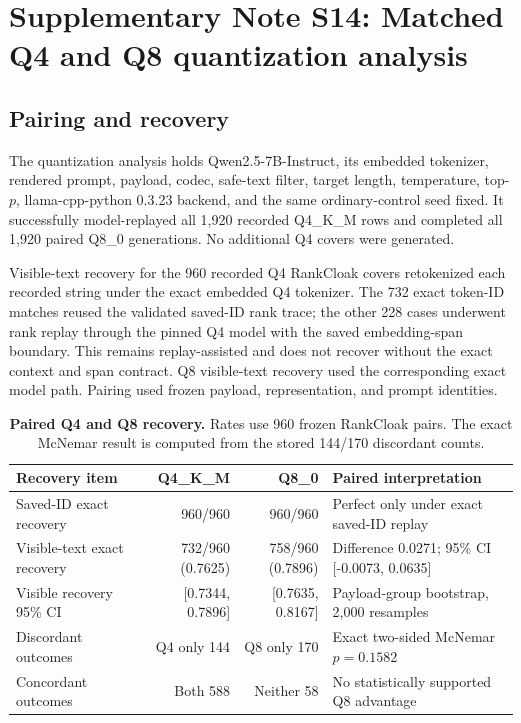 \documentclass[fleqn,10pt]{wlscirep}
\begin{document}
\section*{Supplementary Note S14: Matched Q4 and Q8 quantization analysis}\label{si:s14}

\subsection*{Pairing and recovery}

The quantization analysis holds Qwen2.5-7B-Instruct, its embedded tokenizer, rendered prompt, payload, codec, safe-text filter, target length, temperature, top-\(p\), llama-cpp-python 0.3.23 backend, and the same ordinary-control seed fixed. It successfully model-replayed all 1,920 recorded Q4\_K\_M rows and completed all 1,920 paired Q8\_0 generations. No additional Q4 covers were generated.

Visible-text recovery for the 960 recorded Q4 RankCloak covers retokenized each recorded string under the exact embedded Q4 tokenizer. The 732 exact token-ID matches reused the validated saved-ID rank trace; the other 228 cases underwent rank replay through the pinned Q4 model with the saved embedding-span boundary. This remains replay-assisted and does not recover without the exact context and span contract. Q8 visible-text recovery used the corresponding exact model path. Pairing used frozen payload, representation, and prompt identities.

\begin{table}[H]
\centering
\small
\begin{tabularx}{\textwidth}{L{0.32\textwidth}r r Y}
\toprule
Recovery item & Q4\_K\_M & Q8\_0 & Paired interpretation \\
\midrule
Saved-ID exact recovery & 960/960 & 960/960 & Perfect only under exact saved-ID replay \\
Visible-text exact recovery & 732/960 (0.7625) & 758/960 (0.7896) & Difference 0.0271; 95\% CI [-0.0073, 0.0635] \\
Visible recovery 95\% CI & [0.7344, 0.7896] & [0.7635, 0.8167] & Payload-group bootstrap, 2,000 resamples \\
Discordant outcomes & Q4 only 144 & Q8 only 170 & Exact two-sided McNemar \(p=0.1582\) \\
Concordant outcomes & Both 588 & Neither 58 & No statistically supported Q8 advantage \\
\bottomrule
\end{tabularx}
\caption{\label{tab:v3-quant-recovery}\textbf{Paired Q4 and Q8 recovery.} Rates use 960 frozen RankCloak pairs. The exact McNemar result is computed from the stored 144/170 discordant counts.}
\end{table}
\end{document}
